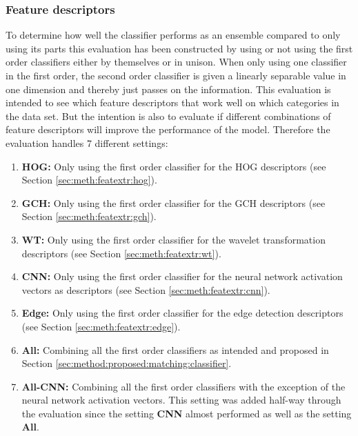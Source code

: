 \subsubsection{Feature descriptors}
\label{sec:method:eval:param:features}
To determine how well the classifier performs as an ensemble compared to only using its parts this evaluation has been constructed by using or not using the first order classifiers either by themselves or in unison. When only using one classifier in the first order, the second order classifier is given a linearly separable value in one dimension and thereby just passes on the information. This evaluation is intended to see which feature descriptors that work well on which categories in the data set. But the intention is also to evaluate if different combinations of feature descriptors will improve the performance of the model. 
Therefore the evaluation handles 7 different settings: 
\begin{enumerate}
	\item \textbf{HOG:} Only using the first order classifier for the HOG descriptors (see Section \ref{sec:meth:featextr:hog}).
	\item \textbf{GCH:} Only using the first order classifier for the GCH descriptors (see Section \ref{sec:meth:featextr:gch}).
	\item \textbf{WT:} Only using the first order classifier for the wavelet transformation descriptors (see Section \ref{sec:meth:featextr:wt}).
	\item \textbf{CNN:} Only using the first order classifier for the neural network activation vectors as descriptors (see Section \ref{sec:meth:featextr:cnn}).
	\item \textbf{Edge:} Only using the first order classifier for the edge detection descriptors (see Section \ref{sec:meth:featextr:edge}).
	\item \textbf{All:} Combining all the first order classifiers as intended and proposed in Section \ref{sec:method:proposed:matching:classifier}. 
	\item \textbf{All-CNN:} Combining all the first order classifiers with the exception of the neural network activation vectors. This setting was added half-way through the evaluation since the setting \textbf{CNN} almost performed as well as the setting \textbf{All}.
\end{enumerate}